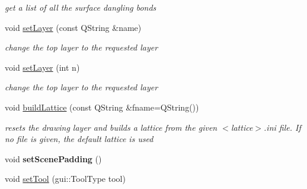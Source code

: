 \begin{DoxyCompactItemize}
\begin{DoxyCompactList}\small\item\em get a list of all the surface dangling bonds \end{DoxyCompactList}\item 
void \hyperlink{classgui_1_1DesignPanel_a9b1b3686b135bff8180fc9c05a10b417}{set\+Layer} (const Q\+String \&name)\hypertarget{classgui_1_1DesignPanel_a9b1b3686b135bff8180fc9c05a10b417}{}\label{classgui_1_1DesignPanel_a9b1b3686b135bff8180fc9c05a10b417}

\begin{DoxyCompactList}\small\item\em change the top layer to the requested layer \end{DoxyCompactList}\item 
void \hyperlink{classgui_1_1DesignPanel_a10236c0af81021104efbee6098105eff}{set\+Layer} (int n)\hypertarget{classgui_1_1DesignPanel_a10236c0af81021104efbee6098105eff}{}\label{classgui_1_1DesignPanel_a10236c0af81021104efbee6098105eff}

\begin{DoxyCompactList}\small\item\em change the top layer to the requested layer \end{DoxyCompactList}\item 
void \hyperlink{classgui_1_1DesignPanel_a02259746dd1ed1f20c8d86144c6ed5cb}{build\+Lattice} (const Q\+String \&fname=Q\+String())\hypertarget{classgui_1_1DesignPanel_a02259746dd1ed1f20c8d86144c6ed5cb}{}\label{classgui_1_1DesignPanel_a02259746dd1ed1f20c8d86144c6ed5cb}

\begin{DoxyCompactList}\small\item\em resets the drawing layer and builds a lattice from the given $<$lattice$>$.ini file. If no file is given, the default lattice is used \end{DoxyCompactList}\item 
void {\bfseries set\+Scene\+Padding} ()\hypertarget{classgui_1_1DesignPanel_aa57bd2a998412c1ba9882f9462e031c8}{}\label{classgui_1_1DesignPanel_aa57bd2a998412c1ba9882f9462e031c8}

\item 
void \hyperlink{classgui_1_1DesignPanel_a10951ab23c093ba62d4c105775afb117}{set\+Tool} (gui\+::\+Tool\+Type tool)\hypertarget{classgui_1_1DesignPanel_a10951ab23c093ba62d4c105775afb117}{}\label{classgui_1_1DesignPanel_a10951ab23c093ba62d4c105775afb117}


\end{DoxyCompactItemize}
